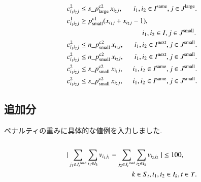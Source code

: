 \documentclass[a4j,11pt,twocolumn]{jsarticle}
\begin{document}
\begin{align}
&{c^2_{i_1i_2j}} \leq s\_p_{\rm{large}}^{\rm{c2}} \hspace{0.15em}{x_{i_2j}}, \hspace{1.56em} {i_1},{i_2} \in I^{\rm{same}}, j \in J^{\rm{large}}. \\
&{c^1_{i_1i_2j}} \geq p_{\rm{small}}^{\rm{c1}} ({x_{i_1j}} + {x_{i_2j}} - 1), \notag \\
&\hspace{10.62em} {i_1},{i_2} \in I, j \in J^{\rm{small}}. \\
&{c^2_{i_1i_2j}} \leq n\_p_{\rm{small}}^{\rm{c2}} \hspace{0.15em}{x_{i_1j}}, \hspace{1.5em} {i_1},{i_2} \in I^{\rm{next}}, j \in J^{\rm{small}}. \\
&{c^2_{i_1i_2j}} \leq n\_p_{\rm{small}}^{\rm{c2}} \hspace{0.15em}{x_{i_2j}}, \hspace{1.5em} {i_1},{i_2} \in I^{\rm{next}}, j \in J^{\rm{small}}. \\
&{c^2_{i_1i_2j}} \leq s\_p_{\rm{small}}^{\rm{c2}} \hspace{0.15em}{x_{i_1j}}, \hspace{1.32em} {i_1},{i_2} \in I^{\rm{same}}, j \in J^{\rm{small}}. \\
&{c^2_{i_1i_2j}} \leq s\_p_{\rm{small}}^{\rm{c2}} \hspace{0.15em}{x_{i_2j}}, \hspace{1.32em} {i_1},{i_2} \in I^{\rm{same}}, j \in J^{\rm{small}}.
\end{align}

\clearpage

\subsection{追加分}
ペナルティの重みに具体的な値例を入力しました. \\
 \\
\begin{align}
&| \sum_{j_1 \in {J_t}^{\rm{load}}} \sum_{i_1\in {I_k}} v_{i_1j_1} - \sum_{j_2 \in {J_t}^{\rm{load}}} \sum_{i_2\in {I_k}} v_{i_2j_2} \hspace{0.3em} | \leq 100, \notag \\
&\hspace{9.15em} k \in S_t, i_1, i_2 \in I_k, t \in T.
\end{align}
\end{document}
